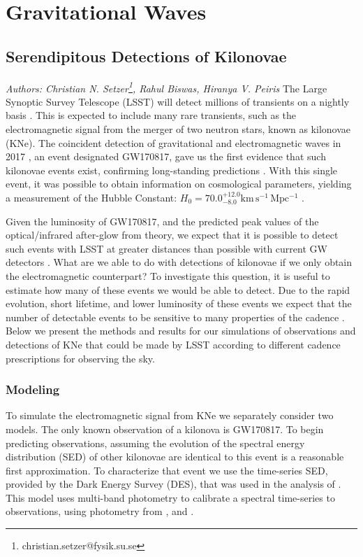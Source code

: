 
\newcommand{\md}{\mathrm{d}}

\section{Gravitational Waves}

\subsection{Serendipitous Detections of Kilonovae}
\textit{Authors: Christian N. Setzer\footnote{christian.setzer@fysik.su.se}, Rahul Biswas, Hiranya V. Peiris}\newline
\newline
The Large Synoptic Survey Telescope (LSST) will detect millions of transients on a nightly basis \citep{LSSTScienceCollaboration2009}. This is expected to include many rare transients, such as the electromagnetic signal from the merger of two neutron stars, known as kilonovae (KNe). The coincident detection of gravitational and electromagnetic waves in 2017 \cite{TheLIGOScientificCollaboration2017, Cowperthwaite2017}, an event designated GW170817, gave us the first evidence that such kilonovae events exist, confirming long-standing predictions \citep{Li1998}. With this single event, it was possible to obtain information on cosmological parameters, yielding a measurement of the Hubble Constant: $H_0 = 70.0^{+12.0}_{-8.0} \mathrm{km\,s^{-1}\,Mpc^{-1}}$ \citep{Abbott2017}.

Given the luminosity of GW170817, and the predicted peak values of the optical/infrared after-glow from theory, we expect that it is possible to detect such events with LSST at greater distances than possible with current GW detectors \citep{Chen2017a}. What are we able to do with detections of kilonovae if we only obtain the electromagnetic counterpart? To investigate this question, it is useful to estimate how many of these events we would be able to detect. Due to the rapid evolution, short lifetime, and lower luminosity of these events we expect that the number of detectable events to be sensitive to many properties of the cadence \citep{LSSTScienceCollaboration2017}. Below we present the methods and results for our simulations of observations and detections of KNe that could be made by LSST according to different cadence prescriptions for observing the sky.

\subsubsection{Modeling}
To simulate the electromagnetic signal from KNe we separately consider two models. The only known observation of a kilonova is GW170817. To begin predicting observations, assuming the evolution of the spectral energy distribution (SED) of other kilonovae are identical to this event is a reasonable first approximation. To characterize that event we use the time-series SED, provided by the Dark Energy Survey (DES), that was used in the analysis of \citeauthor{Scolnic2017a}. This model uses multi-band photometry to calibrate a spectral time-series to observations, using photometry from \citet{Soares-Santos2017}, and
\citet{Cowperthwaite2017}.

